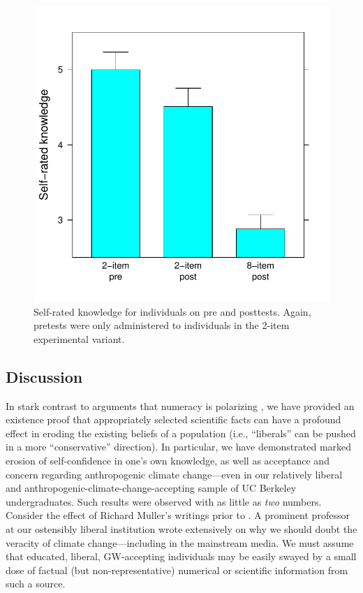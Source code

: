\begin{figure}
    \centering
    \includegraphics{evil-know.pdf}
    \caption{Self-rated knowledge for individuals on pre and posttests. Again,
        pretests were only administered to individuals in the 2-item
        experimental variant.}
    \label{fig:evil-know}
\end{figure}

\subsection{Discussion}

In stark contrast to arguments that numeracy is polarizing
\parencite[e.g.,][]{kahan_polarizing_2012}, we have provided an existence proof that
appropriately selected scientific facts can have a profound effect in eroding
the existing beliefs of a population (i.e., “liberals” can be pushed in a more
“conservative” direction). In particular, we have demonstrated marked erosion of
self-confidence in one's own knowledge, as well as acceptance and concern regarding
anthropogenic climate change---even in our relatively liberal and
anthropogenic-climate-change-accepting sample of UC Berkeley undergraduates.
Such results were observed with as little as \emph{two} numbers.
Consider the effect of Richard Muller's writings prior to \textcite{rohde_new_2013}. A
prominent professor at our ostensibly liberal institution wrote extensively on
why we should doubt the veracity of climate change---including in the mainstream
media. We must assume that educated, liberal, GW-accepting individuals may be
easily swayed by a small dose of factual (but non-representative) numerical or
scientific information from such a source.

